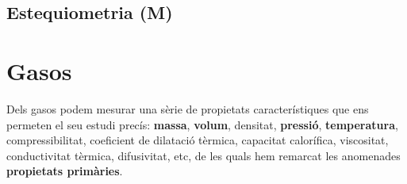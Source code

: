 \newpage

\subsection{Estequiometria (M)}

\section{Gasos}
\label{sec:gasos}

Dels gasos podem mesurar una sèrie de propietats característiques que ens permeten el seu estudi precís: \textbf{massa}, \textbf{volum}, densitat, \textbf{pressió}, \textbf{temperatura}, compressibilitat, coeficient de dilatació tèrmica, capacitat calorífica, viscositat, conductivitat tèrmica, difusivitat, etc, de les quals hem remarcat les anomenades \textbf{propietats primàries}.

